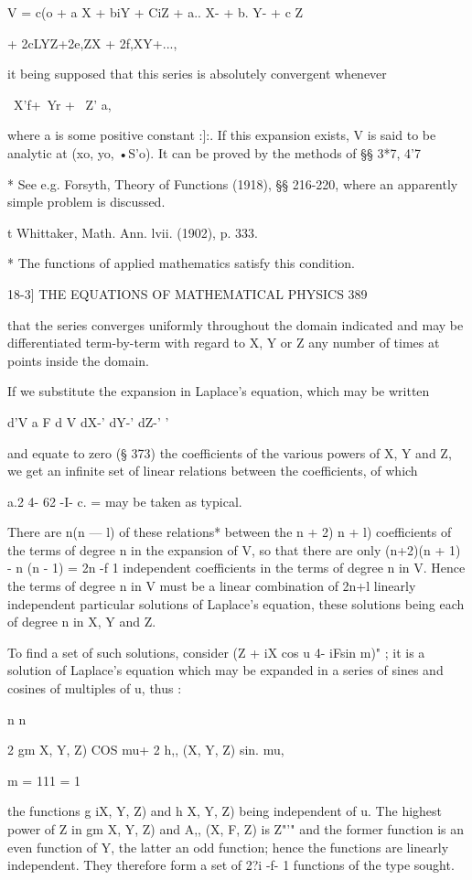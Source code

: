 V = c(o + a X + biY + CiZ + a.. X- + b. Y- + c Z

+ 2cLYZ+2e,ZX + 2f,XY+...,

it being supposed that this series is absolutely convergent whenever

\ X'f+\ Yr + \ Z' a,

where a is some positive constant :]:. If this expansion exists, V is
said to be analytic at (xo, yo, •S'o). It can be proved by the methods
of §§ 3*7, 4'7

* See e.g. Forsyth, Theory of Functions (1918), §§ 216-220, where an
apparently simple problem is discussed.

t Whittaker, Math. Ann. lvii. (1902), p. 333.

* The functions of applied mathematics satisfy this condition.



18-3] THE EQUATIONS OF MATHEMATICAL PHYSICS 389

that the series converges uniformly throughout the domain indicated
and may be differentiated term-by-term with regard to X, Y or Z any
number of times at points inside the domain.

If we substitute the expansion in Laplace's equation, which may be
written

d'V a F d V dX-' dY-' dZ-' '

and equate to zero (§ 373) the coefficients of the various powers of
X, Y and Z, we get an infinite set of linear relations between the
coefficients, of which

a.2 4- 62 -I- c. = may be taken as typical.

There are n(n — l) of these relations* between the n + 2) n + l)
coefficients of the terms of degree n in the expansion of V, so that
there are only (n+2)(n + 1) - n (n - 1) = 2n -f 1 independent
coefficients in the terms of degree n in V. Hence the terms of degree
n in V must be a linear combination of 2n+l linearly independent
particular solutions of Laplace's equation, these solutions being each
of degree n in X, Y and Z.

To find a set of such solutions, consider (Z + iX cos u 4- iFsin m)" ;
it is a solution of Laplace's equation which may be expanded in a
series of sines and cosines of multiples of u, thus :

n n

2 gm X, Y, Z) COS mu+ 2 h,, (X, Y, Z) sin. mu,

m = 111 = 1

the functions g iX, Y, Z) and h X, Y, Z) being independent of u. The
highest power of Z in gm X, Y, Z) and A,, (X, F, Z) is Z"'" and the
former function is an even function of Y, the latter an odd function;
hence the functions are linearly independent. They therefore form a
set of 2?i -f- 1 functions of the type sought.

